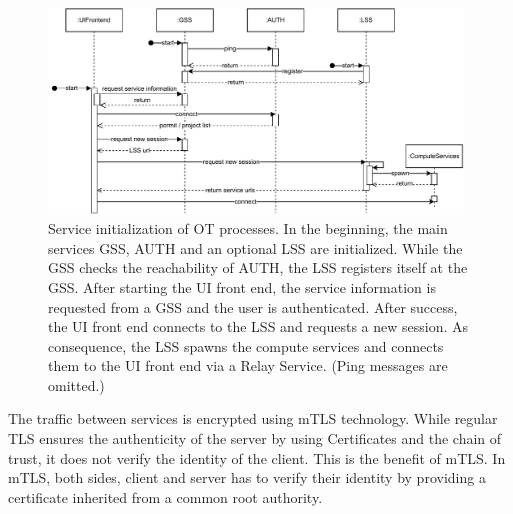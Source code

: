 \begin{figure}[h]
	\centering
	\includegraphics[width=0.98\textwidth]{Figures/opentwin-network-communication-sequence.pdf}
	\caption{Service initialization of \ac{OT} processes. In the beginning, the main services \ac{GSS}, \ac{AUTH} and an optional \ac{LSS} are initialized. While the \ac{GSS} checks the reachability of \ac{AUTH}, the \ac{LSS} registers itself at the \ac{GSS}. After starting the \ac{UI} front end, the service information is requested from a \ac{GSS} and the user is authenticated. After success, the \ac{UI} front end connects to the \ac{LSS} and requests a new session. As consequence, the \ac{LSS} spawns the compute services and connects them to the \ac{UI} front end via a Relay Service. (Ping messages are omitted.)}
	\label{fig:ot-network-communication-sequence}
\end{figure}

The traffic between services is encrypted using \ac{mTLS} technology. While regular \ac{TLS} ensures the authenticity of the server by using Certificates and the chain of trust, it does not verify the identity of the client. This is the benefit of \ac{mTLS}. In \ac{mTLS}, both sides, client and server has to verify their identity by providing a certificate inherited from a common root authority.



